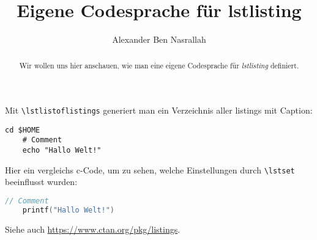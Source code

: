 \documentclass[a4paper]{article}
\title{Eigene Codesprache für lstlisting}
\author{Alexander Ben Nasrallah}
\begin{document}
\maketitle
\begin{abstract}
	Wir wollen uns hier anschauen, wie man eine eigene Codesprache für
	\emph{lstlisting} definiert.
\end{abstract}

Mit \verb+\lstlistoflistings+ generiert man ein Verzeichnis aller listings mit
Caption:
\lstlistoflistings

\begin{lstlisting}[language=cli, title=Titel, caption={Command line}]
	cd $HOME
	# Comment
	echo "Hallo Welt!"
\end{lstlisting}

Hier ein vergleichs c-Code, um zu sehen, welche Einstellungen durch
\verb+\lstset+ beeinflusst wurden:
\begin{lstlisting}[language=C, caption={c-Code mit Standardeinstellungen}]
	// Comment
	printf("Hallo Welt!")
\end{lstlisting}

Siehe auch \url{https://www.ctan.org/pkg/listings}.
\end{document}
